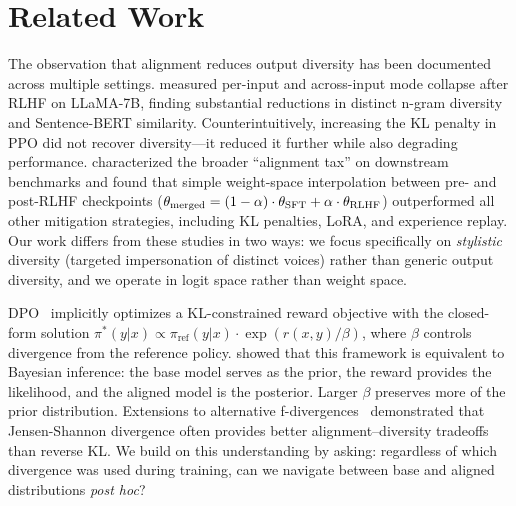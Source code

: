 \section{Related Work}
\label{sec:related}

The observation that alignment reduces output diversity has been documented across
multiple settings. \citet{kirk2023rlhf} measured per-input and across-input mode
collapse after RLHF on LLaMA-7B, finding substantial reductions in distinct n-gram
diversity and Sentence-BERT similarity. Counterintuitively, increasing the KL
penalty in PPO did not recover diversity---it reduced it further while also
degrading performance. \citet{lin2023mitigating} characterized the broader
``alignment tax'' on downstream benchmarks and found that simple weight-space
interpolation between pre- and post-RLHF checkpoints ($\theta_{\text{merged}} =
(1-\alpha) \cdot \theta_{\text{SFT}} + \alpha \cdot
\theta_{\text{RLHF}}$) outperformed all other mitigation strategies, including
KL penalties, LoRA, and experience replay. Our work differs from these studies
in two ways: we focus specifically on \emph{stylistic} diversity (targeted
impersonation of distinct voices) rather than generic output diversity, and we
operate in logit space rather than weight space.

DPO~\cite{rafailov2023dpo} implicitly optimizes a KL-constrained reward objective
with the closed-form solution $\pi^*(y|x) \propto \pi_{\text{ref}}(y|x) \cdot
\exp(r(x,y)/\beta)$, where $\beta$ controls divergence from the reference policy.
\citet{korbak2022rl} showed that this framework is equivalent to Bayesian
inference: the base model serves as the prior, the reward provides the likelihood,
and the aligned model is the posterior. Larger $\beta$ preserves more of the prior
distribution. Extensions to alternative f-divergences~\cite{wang2023fdpo,
go2023fdivergence} demonstrated that Jensen-Shannon divergence often provides
better alignment--diversity tradeoffs than reverse KL. We build on this
understanding by asking: regardless of which divergence was used during training,
can we navigate between base and aligned distributions \emph{post hoc}?

